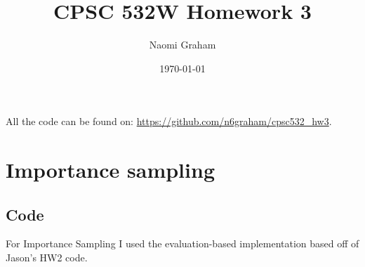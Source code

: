 \documentclass[12pt]{article}%
\theoremstyle{definition}
\begin{document}
	
	\title{CPSC 532W Homework 3}
	\author{Naomi Graham}
	\date{\today}
	\maketitle
	
	All the code can be found on: \url{https://github.com/n6graham/cpsc532_hw3}.
	
	
	
	\section{Importance sampling}
	
	\subsection{Code}
	For Importance Sampling I used the evaluation-based implementation based off of Jason's HW2 code.
	
\end{document}
